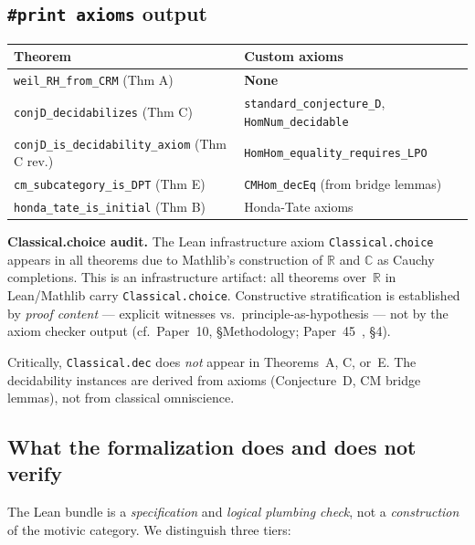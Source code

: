 \documentclass[11pt]{article}
\theoremstyle{definition}
\theoremstyle{remark}
\newcommand{\R}{\mathbb{R}}
\newcommand{\C}{\mathbb{C}}
\begin{document}
\subsection{\texttt{\#print axioms} output}

\begin{center}
\small
\begin{tabular}{ll}
\toprule
\textbf{Theorem} & \textbf{Custom axioms} \\
\midrule
\texttt{weil\_RH\_from\_CRM} (Thm A) & \textbf{None} \\
\texttt{conjD\_decidabilizes} (Thm C) & \texttt{standard\_conjecture\_D}, \texttt{HomNum\_decidable} \\
\texttt{conjD\_is\_decidability\_axiom} (Thm C rev.) & \texttt{HomHom\_equality\_requires\_LPO} \\
\texttt{cm\_subcategory\_is\_DPT} (Thm E) & \texttt{CMHom\_decEq} (from bridge lemmas) \\
\texttt{honda\_tate\_is\_initial} (Thm B) & Honda-Tate axioms \\
\bottomrule
\end{tabular}
\end{center}

\smallskip\noindent
\textbf{Classical.choice audit.} The Lean infrastructure axiom \texttt{Classical.choice} appears in all theorems due to Mathlib's construction of $\R$ and $\C$ as Cauchy completions. This is an infrastructure artifact: all theorems over~$\R$ in Lean/Mathlib carry \texttt{Classical.choice}. Constructive stratification is established by \emph{proof content} --- explicit witnesses vs.\ principle-as-hypothesis --- not by the axiom checker output (cf.\ Paper~10, \S Methodology; Paper~45~\cite{Paper45}, \S4).

Critically, \texttt{Classical.dec} does \emph{not} appear in Theorems~A, C, or~E. The decidability instances are derived from axioms (Conjecture~D, CM bridge lemmas), not from classical omniscience.

\subsection{What the formalization does and does not verify}

The Lean bundle is a \emph{specification} and \emph{logical plumbing check}, not a \emph{construction} of the motivic category. We distinguish three tiers:
\end{document}
